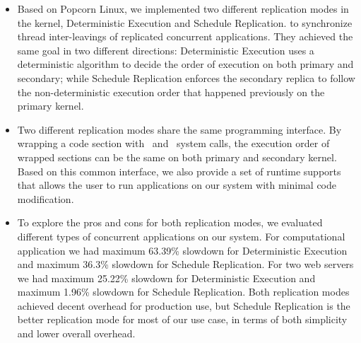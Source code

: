 \begin{itemize}
\item Based on Popcorn Linux, we implemented two different replication modes in the kernel, Deterministic Execution and Schedule Replication. to synchronize thread inter-leavings of replicated concurrent applications. They achieved the same goal in two different directions: Deterministic Execution uses a deterministic algorithm to decide the order of execution on both primary and secondary; while Schedule Replication enforces the secondary replica to follow the non-deterministic execution order that happened previously on the primary kernel.

\item Two different replication modes share the same programming interface. By wrapping a code section with \detstart\ and \detend\ system calls, the execution order of wrapped sections can be the same on both primary and secondary kernel. Based on this common interface, we also provide a set of runtime supports that allows the user to run applications on our system with minimal code modification.

\item To explore the pros and cons for both replication modes, we evaluated different types of concurrent applications on our system. For computational application we had maximum 63.39\% slowdown for Deterministic Execution and maximum 36.3\% slowdown for Schedule Replication. For two web servers we had maximum 25.22\% slowdown for Deterministic Execution and maximum 1.96\% slowdown for Schedule Replication. Both replication modes achieved decent overhead for production use, but Schedule Replication is the better replication mode for most of our use case, in terms of both simplicity and lower overall overhead.
\end{itemize}